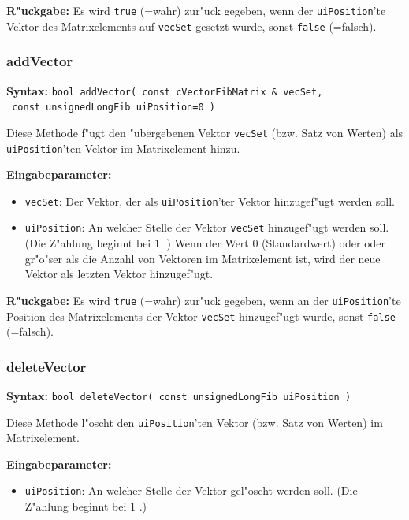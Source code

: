 \bigskip\noindent
\textbf{R"uckgabe:} Es wird \verb|true| (=wahr) zur"uck gegeben, wenn der \verb|uiPosition|'te Vektor des Matrixelements auf \verb|vecSet| gesetzt wurde, sonst \verb|false| (=falsch).


\subsubsection{addVector}

\textbf{Syntax:} \verb|bool addVector( const cVectorFibMatrix & vecSet,| \\\verb| const unsignedLongFib uiPosition=0 )|

\bigskip\noindent
Diese Methode f"ugt den "ubergebenen Vektor \verb|vecSet| (bzw. Satz von Werten) als \verb|uiPosition|'ten Vektor im Matrixelement hinzu.

\bigskip\noindent
\textbf{Eingabeparameter:}
\begin{itemize}
 \item \verb|vecSet|: Der Vektor, der als \verb|uiPosition|'ter Vektor hinzugef"ugt werden soll.
 \item \verb|uiPosition|: An welcher Stelle der Vektor \verb|vecSet| hinzugef"ugt werden soll. (Die Z"ahlung beginnt bei $1$ .) Wenn der Wert $0$ (Standardwert) oder oder gr"o"ser als die Anzahl von Vektoren im Matrixelement ist, wird der neue Vektor als letzten Vektor hinzugef"ugt.
\end{itemize}

\bigskip\noindent
\textbf{R"uckgabe:} Es wird \verb|true| (=wahr) zur"uck gegeben, wenn an der \verb|uiPosition|'te Position des Matrixelements der Vektor \verb|vecSet| hinzugef"ugt wurde, sonst \verb|false| (=falsch).


\subsubsection{deleteVector}

\textbf{Syntax:} \verb|bool deleteVector( const unsignedLongFib uiPosition )|

\bigskip\noindent
Diese Methode l"oscht den \verb|uiPosition|'ten Vektor (bzw. Satz von Werten) im Matrixelement.

\bigskip\noindent
\textbf{Eingabeparameter:}
\begin{itemize}
 \item \verb|uiPosition|: An welcher Stelle der Vektor gel"oscht werden soll. (Die Z"ahlung beginnt bei $1$ .)
\end{itemize}


